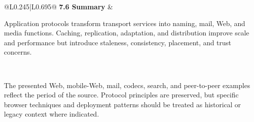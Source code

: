 \documentclass[10pt,letterpaper]{article}
\begin{document}
\begin{longtable}{@{}L{0.245\textwidth}|L{0.695\textwidth}@{}}
\textbf{7.6 Summary} & \begin{minipage}[t]{\linewidth}\raggedright Application protocols transform transport services into naming, mail, Web, and media functions. Caching, replication, adaptation, and distribution improve scale and performance but introduce staleness, consistency, placement, and trust concerns.\end{minipage} \\ \hline
\end{longtable}

\begin{legacybox}The presented Web, mobile-Web, mail, codecs, search, and peer-to-peer examples reflect the period of the source. Protocol principles are preserved, but specific browser techniques and deployment patterns should be treated as historical or legacy context where indicated.\end{legacybox}

\end{document}

